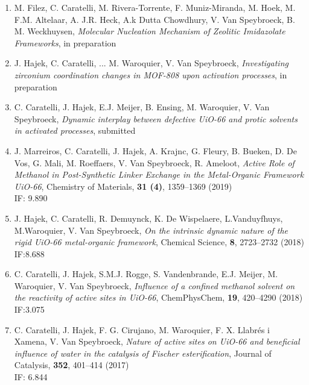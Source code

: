 \begin{enumerate}
\item
M. Filez, C. Caratelli, M. Rivera-Torrente, F. Muniz-Miranda, M. Hoek, M. F.M. Altelaar, A. J.R. Heck, A.k Dutta Chowdhury, V. Van Speybroeck, B. M. Weckhuysen, 
\textit{Molecular Nucleation Mechanism of Zeolitic Imidazolate Frameworks}, in preparation\\

\item
J. Hajek, C. Caratelli, ... M. Waroquier, V. Van Speybroeck, 
\textit{Investigating zirconium coordination changes in MOF-808 upon activation processes}, in preparation\\ 

\item
C. Caratelli, J. Hajek, E.J. Meijer, B. Ensing, M. Waroquier, V. Van Speybroeck, 
\textit{Dynamic interplay between defective UiO-66 and protic solvents in activated processes}, submitted\\ 

\item
J. Marreiros, C. Caratelli, J. Hajek, A. Krajnc, G. Fleury, B. Bueken, D. De Vos, G. Mali, M. Roeffaers, V. Van Speybroeck, R. Ameloot, 
\textit{Active Role of Methanol in Post-Synthetic Linker Exchange in the Metal-Organic Framework UiO-66}, Chemistry of Materials, \textbf{31 (4)}, 1359--1369 (2019)\\ 
IF: 9.890

\item
J. Hajek, C. Caratelli, R. Demuynck, K. De Wispelaere, L.Vanduyfhuys, M.Waroquier, V. Van Speybroeck, 
\textit{On the intrinsic dynamic nature of the rigid UiO-66 metal-organic framework},  Chemical Science, \textbf{8}, 2723--2732 (2018)\\ IF:8.688

\item
C. Caratelli, J. Hajek, S.M.J. Rogge, S. Vandenbrande, E.J. Meijer, M. Waroquier, V. Van Speybroeck, 
\textit{Influence of a confined methanol solvent on the reactivity of active sites in UiO-66}, ChemPhysChem, \textbf{19}, 420--4290 (2018)\\ 
IF:3.075 

\item
C. Caratelli, J. Hajek, F. G. Cirujano, M. Waroquier, F. X. Llabr\'es i Xamena, V. Van Speybroeck, 
\textit{Nature of active sites on UiO-66 and beneficial influence of water in the catalysis of Fischer esterification},
Journal of Catalysis, \textbf{352}, 401--414 (2017) \\
IF: 6.844

\end{enumerate}

